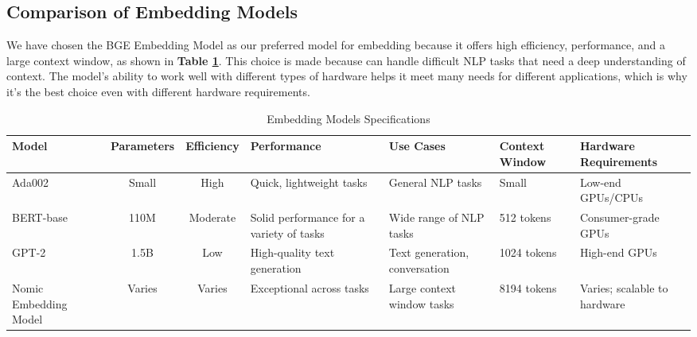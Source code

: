 \subsection{Comparison of Embedding Models}
We have chosen the BGE Embedding Model as our preferred model for embedding because it offers high efficiency, performance, and a large context window, as shown in \textbf{Table \ref{tab:EMS}}. This choice is made because
can handle difficult NLP tasks that need a deep understanding of context. The model's ability to work well with different types of hardware helps it meet many needs for different applications, which is why it's the best choice even with different hardware requirements.
\begin{table}[H]
\label{tab:EMS}
\begin{center}
\caption{Embedding Models Specifications}

\begin{tabular}{|p{2cm}|c|c|p{2.5cm}|p{2cm}|p{2cm}|p{2.2cm}|}
\hline
\rowcolor[gray]{0.8} 
\textbf{Model} & \textbf{Parameters} & \textbf{Efficiency} & \textbf{Performance} & \textbf{Use Cases} & \textbf{Context Window} & \textbf{Hardware Requirements} \\ \hline
Ada002 & Small & High & Quick, lightweight tasks & General NLP tasks & Small & Low-end GPUs/CPUs \\ \hline
BERT-base & 110M & Moderate & Solid performance for a variety of tasks & Wide range of NLP tasks & 512 tokens & Consumer-grade GPUs \\ \hline
GPT-2 & 1.5B & Low & High-quality text generation & Text generation, conversation & 1024 tokens & High-end GPUs \\ \hline
Nomic Embedding Model & Varies & Varies & Exceptional across tasks & Large context window tasks & 8194 tokens & Varies; scalable to hardware \\ \hline
\end{tabular}
\end{center}
\end{table}

